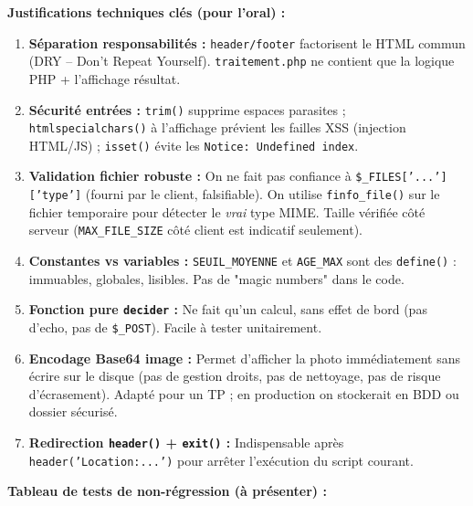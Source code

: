 \documentclass[11pt]{article}
\begin{document}
\begin{exoresolu}
\textbf{Justifications techniques clés (pour l'oral) :}
\begin{enumerate}
    \item \textbf{Séparation responsabilités :} \texttt{header/footer} factorisent le HTML commun (DRY -- Don't Repeat Yourself). \texttt{traitement.php} ne contient que la logique PHP + l'affichage résultat.
    \item \textbf{Sécurité entrées :} \texttt{trim()} supprime espaces parasites ; \texttt{htmlspecialchars()} à l'affichage prévient les failles XSS (injection HTML/JS) ; \texttt{isset()} évite les \texttt{Notice: Undefined index}.
    \item \textbf{Validation fichier robuste :} On ne fait pas confiance à \texttt{\$\_FILES['...']['type']} (fourni par le client, falsifiable). On utilise \texttt{finfo\_file()} sur le fichier temporaire pour détecter le \emph{vrai} type MIME. Taille vérifiée côté serveur (\texttt{MAX\_FILE\_SIZE} côté client est indicatif seulement).
    \item \textbf{Constantes vs variables :} \texttt{SEUIL\_MOYENNE} et \texttt{AGE\_MAX} sont des \texttt{define()} : immuables, globales, lisibles. Pas de "magic numbers" dans le code.
    \item \textbf{Fonction pure \texttt{decider} :} Ne fait qu'un calcul, sans effet de bord (pas d'echo, pas de \texttt{\$\_POST}). Facile à tester unitairement.
    \item \textbf{Encodage Base64 image :} Permet d'afficher la photo immédiatement sans écrire sur le disque (pas de gestion droits, pas de nettoyage, pas de risque d'écrasement). Adapté pour un TP ; en production on stockerait en BDD ou dossier sécurisé.
    \item \textbf{Redirection \texttt{header()} + \texttt{exit()} :} Indispensable après \texttt{header('Location:...')} pour arrêter l'exécution du script courant.
\end{enumerate}

\textbf{Tableau de tests de non-régression (à présenter) :}


\end{exoresolu}
\end{document}
